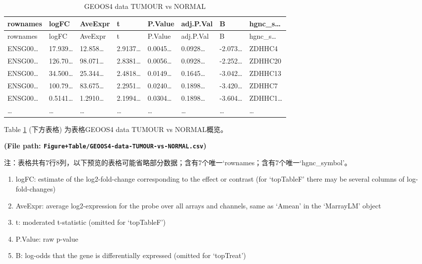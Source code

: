 \documentclass[
]{article}
\providecommand{\tightlist}{%
  \setlength{\itemsep}{0pt}\setlength{\parskip}{0pt}}
\begin{document}
\begin{longtable}[]{@{}llllllll@{}}
\caption{\label{tab:GEOOS4-data-TUMOUR-vs-NORMAL}GEOOS4 data TUMOUR vs NORMAL}\tabularnewline
\toprule
rownames & logFC & AveExpr & t & P.Value & adj.P.Val & B & hgnc\_s\ldots{}\tabularnewline
\midrule
\endfirsthead
\toprule
rownames & logFC & AveExpr & t & P.Value & adj.P.Val & B & hgnc\_s\ldots{}\tabularnewline
\midrule
\endhead
ENSG00\ldots{} & 17.939\ldots{} & 12.858\ldots{} & 2.9137\ldots{} & 0.0045\ldots{} & 0.0928\ldots{} & -2.073\ldots{} & ZDHHC4\tabularnewline
ENSG00\ldots{} & 126.70\ldots{} & 98.071\ldots{} & 2.8381\ldots{} & 0.0056\ldots{} & 0.0928\ldots{} & -2.252\ldots{} & ZDHHC20\tabularnewline
ENSG00\ldots{} & 34.500\ldots{} & 25.344\ldots{} & 2.4818\ldots{} & 0.0149\ldots{} & 0.1645\ldots{} & -3.042\ldots{} & ZDHHC13\tabularnewline
ENSG00\ldots{} & 100.79\ldots{} & 83.675\ldots{} & 2.2951\ldots{} & 0.0240\ldots{} & 0.1898\ldots{} & -3.420\ldots{} & ZDHHC7\tabularnewline
ENSG00\ldots{} & 0.5141\ldots{} & 1.2910\ldots{} & 2.1994\ldots{} & 0.0304\ldots{} & 0.1898\ldots{} & -3.604\ldots{} & ZDHHC1\ldots{}\tabularnewline
\ldots{} & \ldots{} & \ldots{} & \ldots{} & \ldots{} & \ldots{} & \ldots{} & \ldots{}\tabularnewline
\bottomrule
\end{longtable}

Table \ref{tab:GEOOS4-data-TUMOUR-vs-NORMAL} (下方表格) 为表格GEOOS4 data TUMOUR vs NORMAL概览。

\textbf{(File path: \texttt{Figure+Table/GEOOS4-data-TUMOUR-vs-NORMAL.csv})}

\begin{center}\begin{tcolorbox}[colback=gray!10, colframe=gray!50, width=0.9\linewidth, arc=1mm, boxrule=0.5pt]注：表格共有7行8列，以下预览的表格可能省略部分数据；含有7个唯一`rownames；含有7个唯一`hgnc\_symbol'。
\end{tcolorbox}
\end{center}
\begin{center}\begin{tcolorbox}[colback=gray!10, colframe=gray!50, width=0.9\linewidth, arc=1mm, boxrule=0.5pt]\begin{enumerate}\tightlist
\item logFC:  estimate of the log2-fold-change corresponding to the effect or contrast (for ‘topTableF’ there may be several columns of log-fold-changes)
\item AveExpr:  average log2-expression for the probe over all arrays and channels, same as ‘Amean’ in the ‘MarrayLM’ object
\item t:  moderated t-statistic (omitted for ‘topTableF’)
\item P.Value:  raw p-value
\item B:  log-odds that the gene is differentially expressed (omitted for ‘topTreat’)
\end{enumerate}\end{tcolorbox}
\end{center}
\end{document}
